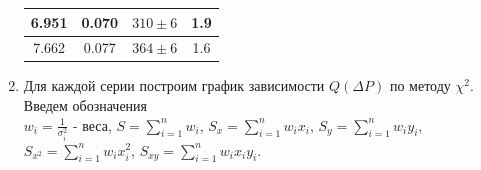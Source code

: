 \documentclass[a4paper]{article}
\begin{document}
\begin{enumerate}
\begin{multicols}{2}
\begin{center}
\begin{tabular}{|c|c|c|c|}
        6.951 & 0.070 & $310 \pm 6$ & 1.9 \\ \hline
        7.662 & 0.077 & $364 \pm 6$ & 1.6 \\ \hline
    \end{tabular}
\end{center}
\end{multicols}
\item Для каждой серии построим график зависимости $Q(\Delta P)$ по методу $\chi^2$.
Введем обозначения\\
$w_i = \frac{1}{\sigma_i^2}\text{ - веса}$, $S = \displaystyle \sum_{i=1}^{n} w_i$, $S_x = \displaystyle \sum_{i=1}^{n} w_ix_i$, $S_y = \displaystyle \sum_{i=1}^{n} w_iy_i$, $S_{x^2} = \displaystyle \sum_{i=1}^{n} w_ix_i^2$, $S_{xy} = \displaystyle \sum_{i=1}^{n} w_ix_iy_i$.


\end{enumerate}
\end{document}
